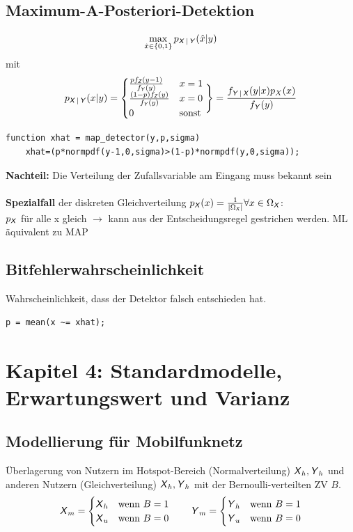 \documentclass[deutsch]{latex4ei/latex4ei_sheet}
\begin{document}
\begin{sectionbox}
	\subsection{Maximum-A-Posteriori-Detektion}
	\[\max_{\hat x \in \{0,1\}} p_{\X|\Y}(\hat x|y)\] mit
	\[p_{\X|\Y}(x|y)=\begin{cases}
	 \frac{p f_{\Z}(y-1)}{f_{\Y}(y)} & x=1\\
	\frac{(1-p)f_{\Z}(y)}{f_{\Y}(y)} & x=0\\
	0 & \text{sonst}
	\end{cases} 
	\Bigg\} = \frac{f_{\Y|\X}(y|x)p_{X}(x)}{f_{\Y}(y)}\]
	\begin{lstlisting}[gobble=4]
	function xhat = map_detector(y,p,sigma)
	xhat=(p*normpdf(y-1,0,sigma)>(1-p)*normpdf(y,0,sigma));
	\end{lstlisting}
	\textbf{Nachteil:} Die Verteilung der Zufallsvariable am Eingang muss bekannt sein\\
	\\

	\textbf{Spezialfall} der diskreten Gleichverteilung $p_{\X}(x)=\frac{1}{\abs{\Omega_{\X}}} \forall x \in \Omega_{\X}$:\\
	$p_{\X}$ für alle x gleich $\to$ kann aus der Entscheidungsregel gestrichen
	werden. ML äquivalent zu MAP
\end{sectionbox}

\begin{sectionbox}
	\subsection{Bitfehlerwahrscheinlichkeit}
	Wahrscheinlichkeit, dass der Detektor falsch entschieden hat.
	\begin{lstlisting}[gobble=4]
	p = mean(x ~= xhat);
	\end{lstlisting}
\end{sectionbox}

\section{Kapitel 4: Standardmodelle, Erwartungswert und Varianz}
\begin{sectionbox}
	\subsection{Modellierung für Mobilfunknetz}
	Überlagerung von Nutzern im Hotspot-Bereich (Normalverteilung) $\X_h, \Y_h$ und anderen Nutzern (Gleichverteilung) $\X_h, \Y_h$ mit der Bernoulli-verteilten ZV $B$.
	\[\X_m=\begin{cases}
	\X_h & \text{wenn } B=1\\
	\X_u & \text{wenn } B=0\\
	\end{cases} \qquad 
	\Y_m=\begin{cases}
	\Y_h & \text{wenn } B=1\\
	\Y_u & \text{wenn } B=0\\
	\end{cases}
	\]
	
\end{sectionbox}
\end{document}
